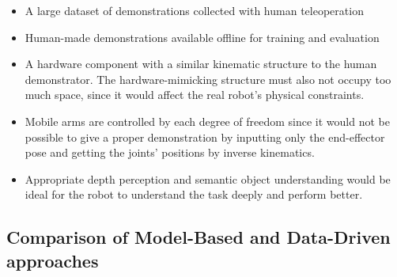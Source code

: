 \begin{itemize}
	\item A large dataset of demonstrations collected with human teleoperation
	\item Human-made demonstrations available offline for training and evaluation
	\item A hardware component with a similar kinematic structure to the human demonstrator.
	      The hardware-mimicking structure must also not occupy too much space, since it would
	      affect the real robot's physical constraints.
	\item Mobile arms are controlled by each degree of freedom since it would not be possible
	      to give a proper demonstration by inputting only the end-effector pose and getting
	      the joints' positions by inverse kinematics.
	\item Appropriate depth perception and semantic object understanding would be ideal
	      for the robot to understand the task deeply and perform better.
\end{itemize}



\subsection{Comparison of Model-Based and Data-Driven approaches}

